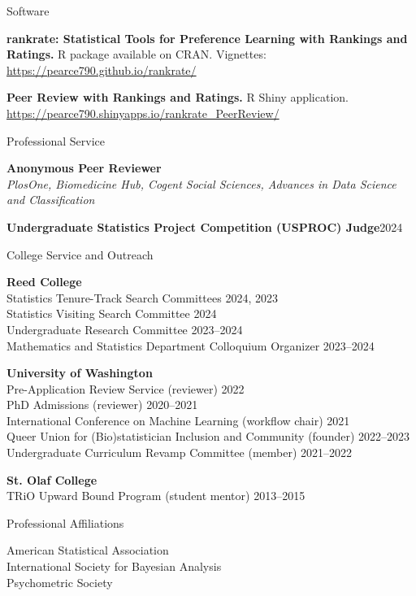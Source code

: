 \documentclass{resume} %
\begin{document}
\begin{rSection}{Software}

\textbf{rankrate: Statistical Tools for Preference Learning with Rankings and Ratings.} R package available on CRAN. Vignettes: \url{https://pearce790.github.io/rankrate/} 

\textbf{Peer Review with Rankings and Ratings.} R Shiny application. \url{https://pearce790.shinyapps.io/rankrate_PeerReview/}

\end{rSection}


\begin{rSection}{Professional Service}

\textbf{Anonymous Peer Reviewer}
\\{\it PlosOne, Biomedicine Hub, Cogent Social Sciences, Advances in Data Science and Classification}

\textbf{Undergraduate Statistics Project Competition (USPROC) Judge}\hfill{2024}

\end{rSection}

\begin{rSection}{College Service and Outreach}

\textbf{Reed College}
\\ Statistics Tenure-Track Search Committees \hfill{2024, 2023}
\\ Statistics Visiting Search Committee \hfill{2024}
\\ Undergraduate Research Committee \hfill{2023--2024}
\\ Mathematics and Statistics Department Colloquium Organizer \hfill{2023--2024}

\textbf{University of Washington}
\\ Pre-Application Review Service (reviewer) \hfill{2022}
\\ PhD Admissions (reviewer) \hfill{2020--2021}
\\ International Conference on Machine Learning (workflow chair) \hfill{2021}
\\ Queer Union for (Bio)statistician Inclusion and Community (founder) \hfill{2022--2023}
\\ Undergraduate Curriculum Revamp Committee (member) \hfill {2021--2022}

\textbf{St. Olaf College}
\\ TRiO Upward Bound Program (student mentor) \hfill {2013--2015}

\end{rSection}

\begin{rSection}{Professional Affiliations}

American Statistical Association
\\ International Society for Bayesian Analysis
\\ Psychometric Society

\end{rSection}
\end{document}
